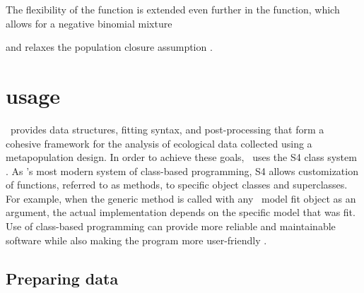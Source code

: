\documentclass[article,shortnames]{jss}
\newcommand{\um}{\pkg{unmarked}}
\newcommand{\rlang}{\proglang{R}}
\begin{document}
The flexibility of the  function is extended even 
further in the  function, which allows for a negative binomial
mixture {\citep{DorazioEA05} and relaxes the population closure assumption
\citep{chandlerEAip_TempEm}. 

\section[unmarked usage]{ usage}
\label{sec:unmarked-usage}

\um\ provides data structures, fitting syntax, and post-processing that form a
cohesive framework for the analysis of ecological data collected using  
a metapopulation design. In order to achieve these goals, \um\ uses the S4 
class system \citep{Chambers2008}. As \rlang's most modern system of class-based
programming, S4 allows customization of functions, referred to as
methods, to specific object classes and superclasses. For example,
when the generic  method is called with any \um\ model
fit object as an argument, the actual  implementation
depends on the specific model that was fit.  Use of class-based
programming can provide more reliable and maintainable software while
also making the program more user-friendly \citep{Chambers2008}.


\subsection{Preparing data}
\label{sec:data-requirements}

}
\end{document}
